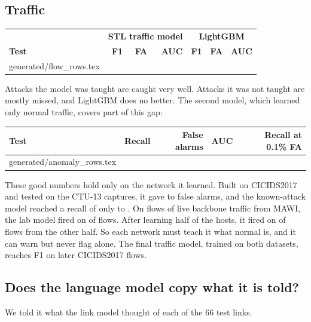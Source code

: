 \documentclass[11pt,a4paper]{article}
\makeatletter
\newcommand{\need}[1][10]{\Needspace{#1\baselineskip}}
\newcommand{\tablerows}[1]{\@@input #1 }
\makeatother
\begin{document}
\need[13]
\subsection*{Traffic}

\begin{center}
\small
\begin{tabular}{@{}lrrrrrr@{}}
\toprule
 & \multicolumn{3}{c}{\textbf{STL traffic model}} & \multicolumn{3}{c}{\textbf{LightGBM}} \\
\textbf{Test} & \textbf{F1} & \textbf{FA} & \textbf{AUC} & \textbf{F1} & \textbf{FA} & \textbf{AUC} \\
\midrule
\tablerows{generated/flow_rows.tex}
\bottomrule
\end{tabular}
\end{center}

Attacks the model was taught are caught very well. Attacks it was not taught are mostly missed, and LightGBM does no better. The second model, which learned only normal traffic, covers part of this gap:

\begin{center}
\small
\begin{tabular}{@{}lrrrr@{}}
\toprule
\textbf{Test} & \textbf{Recall} & \textbf{False alarms} & \textbf{AUC} & \textbf{Recall at 0.1\% FA} \\
\midrule
\tablerows{generated/anomaly_rows.tex}
\bottomrule
\end{tabular}
\end{center}

These good numbers hold only on the network it learned. Built on CICIDS2017 and tested on the CTU-13 captures, it gave \crossFALow{} to \crossFAHigh{} false alarms, and the known-attack model reached a recall of only \crossRecallLow{} to \crossRecallHigh{}. On \backboneFlows{} flows of live backbone traffic from MAWI, the lab model fired on \backboneLab{} of flows. After learning half of the hosts, it fired on \backboneLocal{} of flows from the other half. So each network must teach it what normal is, and it can warn but never flag alone. The final traffic model, trained on both datasets, reaches F1 \finalLater{} on later CICIDS2017 flows.

\need[10]
\subsection*{Does the language model copy what it is told?}

We told it what the link model thought of each of the 66 test links.
\end{document}
